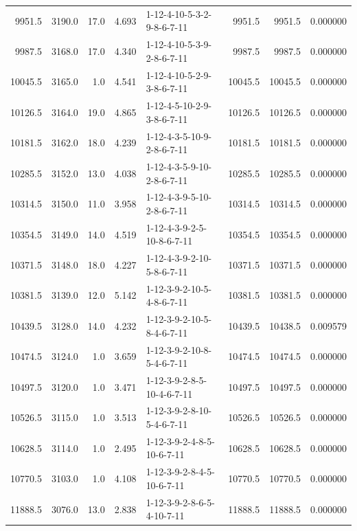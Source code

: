 \begin{tabular}{rrrrlrrr}
  9951.5 &  3190.0 &           17.0 &              4.693 &  1-12-4-10-5-3-2-9-8-6-7-11 &        9951.5 &          9951.5 &  0.000000 \\
  9987.5 &  3168.0 &           17.0 &              4.340 &  1-12-4-10-5-3-9-2-8-6-7-11 &        9987.5 &          9987.5 &  0.000000 \\
 10045.5 &  3165.0 &            1.0 &              4.541 &  1-12-4-10-5-2-9-3-8-6-7-11 &       10045.5 &         10045.5 &  0.000000 \\
 10126.5 &  3164.0 &           19.0 &              4.865 &  1-12-4-5-10-2-9-3-8-6-7-11 &       10126.5 &         10126.5 &  0.000000 \\
 10181.5 &  3162.0 &           18.0 &              4.239 &  1-12-4-3-5-10-9-2-8-6-7-11 &       10181.5 &         10181.5 &  0.000000 \\
 10285.5 &  3152.0 &           13.0 &              4.038 &  1-12-4-3-5-9-10-2-8-6-7-11 &       10285.5 &         10285.5 &  0.000000 \\
 10314.5 &  3150.0 &           11.0 &              3.958 &  1-12-4-3-9-5-10-2-8-6-7-11 &       10314.5 &         10314.5 &  0.000000 \\
 10354.5 &  3149.0 &           14.0 &              4.519 &  1-12-4-3-9-2-5-10-8-6-7-11 &       10354.5 &         10354.5 &  0.000000 \\
 10371.5 &  3148.0 &           18.0 &              4.227 &  1-12-4-3-9-2-10-5-8-6-7-11 &       10371.5 &         10371.5 &  0.000000 \\
 10381.5 &  3139.0 &           12.0 &              5.142 &  1-12-3-9-2-10-5-4-8-6-7-11 &       10381.5 &         10381.5 &  0.000000 \\
 10439.5 &  3128.0 &           14.0 &              4.232 &  1-12-3-9-2-10-5-8-4-6-7-11 &       10439.5 &         10438.5 &  0.009579 \\
 10474.5 &  3124.0 &            1.0 &              3.659 &  1-12-3-9-2-10-8-5-4-6-7-11 &       10474.5 &         10474.5 &  0.000000 \\
 10497.5 &  3120.0 &            1.0 &              3.471 &  1-12-3-9-2-8-5-10-4-6-7-11 &       10497.5 &         10497.5 &  0.000000 \\
 10526.5 &  3115.0 &            1.0 &              3.513 &  1-12-3-9-2-8-10-5-4-6-7-11 &       10526.5 &         10526.5 &  0.000000 \\
 10628.5 &  3114.0 &            1.0 &              2.495 &  1-12-3-9-2-4-8-5-10-6-7-11 &       10628.5 &         10628.5 &  0.000000 \\
 10770.5 &  3103.0 &            1.0 &              4.108 &  1-12-3-9-2-8-4-5-10-6-7-11 &       10770.5 &         10770.5 &  0.000000 \\
 11888.5 &  3076.0 &           13.0 &              2.838 &  1-12-3-9-2-8-6-5-4-10-7-11 &       11888.5 &         11888.5 &  0.000000 \\
\bottomrule
\end{tabular}
